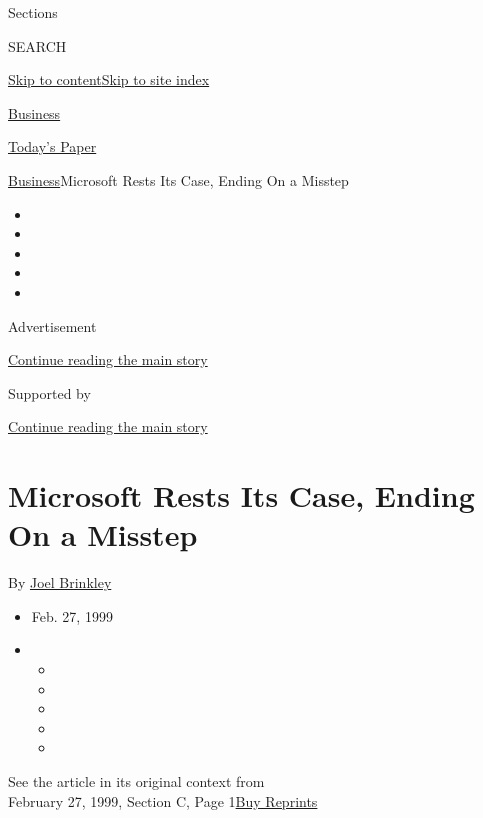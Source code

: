 Sections

SEARCH

\protect\hyperlink{site-content}{Skip to
content}\protect\hyperlink{site-index}{Skip to site index}

\href{https://www.nytimes3xbfgragh.onion/section/business}{Business}

\href{https://myaccount.nytimes3xbfgragh.onion/auth/login?response_type=cookie\&client_id=vi}{}

\href{https://www.nytimes3xbfgragh.onion/section/todayspaper}{Today's
Paper}

\href{/section/business}{Business}\textbar{}Microsoft Rests Its Case,
Ending On a Misstep

\begin{itemize}
\item
\item
\item
\item
\item
\end{itemize}

Advertisement

\protect\hyperlink{after-top}{Continue reading the main story}

Supported by

\protect\hyperlink{after-sponsor}{Continue reading the main story}

\hypertarget{microsoft-rests-its-case-ending-on-a-misstep}{%
\section{Microsoft Rests Its Case, Ending On a
Misstep}\label{microsoft-rests-its-case-ending-on-a-misstep}}

By
\href{https://topics.nytimes3xbfgragh.onion/top/reference/timestopics/people/b/joel_brinkley/index.html}{Joel
Brinkley}

\begin{itemize}
\item
  Feb. 27, 1999
\item
  \begin{itemize}
  \item
  \item
  \item
  \item
  \item
  \end{itemize}
\end{itemize}

See the article in its original context from\\
February 27, 1999, Section C, Page
1\href{https://store.nytimes3xbfgragh.onion/collections/new-york-times-page-reprints?utm_source=nytimes\&utm_medium=article-page\&utm_campaign=reprints}{Buy
Reprints}

